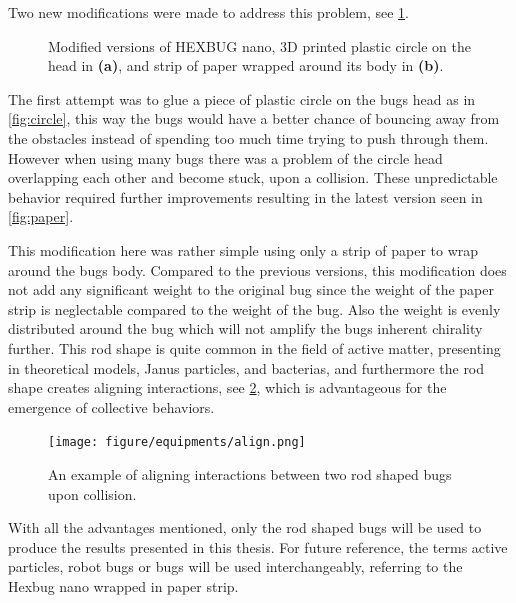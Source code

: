 Two new modifications were made to address this problem, see \cref{fig:shape}.

\begin{figure}[htpb!]
    \centering
    \caption{Modified versions of HEXBUG nano, 3D printed plastic circle on the head in \textbf{(a)}, and 
    strip of paper wrapped around its body in \textbf{(b)}.}
    \label{fig:shape}
\end{figure}

The first attempt was to glue a piece of plastic circle on the bugs head as in \cref{fig:circle}, this way 
the bugs would have a better chance of bouncing away from the obstacles instead of spending too much time trying to push through them. 
However when using many bugs there was a problem of the circle head overlapping each other and become stuck, upon a collision. 
These unpredictable behavior required further improvements resulting in the latest version seen in \cref{fig:paper}. 

This modification here was rather simple using only a strip of paper to wrap around the bugs body. 
Compared to the previous versions, this modification does not add any significant weight to the original 
bug since the weight of the paper strip is neglectable compared to the weight of the bug. Also the weight 
is evenly distributed around the bug which will not amplify the bugs inherent chirality further. 
This rod shape is quite common in the field of active matter, presenting in theoretical models\cite{peruani2008individual}, 
Janus particles\cite{paxton2004catalytic}, and bacterias\cite{berg2008coli}, and furthermore 
the rod shape creates aligning interactions, see \cref{fig:align}, which is advantageous for the emergence of collective behaviors.

\begin{figure}[htpb!]
    \centering
    \texttt{[image: figure/equipments/align.png]}
    \caption{An example of aligning interactions between two rod shaped bugs upon collision.}
    \label{fig:align}
\end{figure}

With all the advantages mentioned, only the rod shaped bugs will be used to produce the results presented in this thesis.
For future reference, the terms active particles, robot bugs or bugs will be used interchangeably, referring to 
the Hexbug nano wrapped in paper strip.


